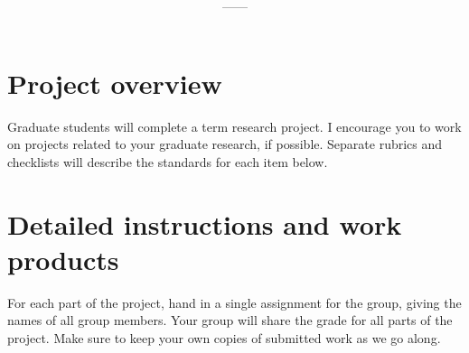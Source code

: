 \documentclass[11pt,onecolumn]{article}
\title{\textbf{\coursename}}
\author{{\semester}---{\roomnumb}---{\classtimes}}
\date{}
\makeatletter
\newcommand{\myname}{A.~Grant Schissler}
\newcommand{\myemail}{aschissler@unr.edu}
\newcommand{\office}{DMSC 224}
\newcommand{\officehours}{Tue 4pm-5pm, Wed 4pm-5pm, or by appointment}
\makeatother
\begin{document}
\maketitle

\vspace{-0.25in}
\noindent\makebox[\linewidth]{\rule{\textwidth}{1pt}}


\section*{Project overview}
Graduate students will complete a term research project. I encourage you to work on projects related to your graduate research, if possible. Separate rubrics and checklists will describe the standards for each item below.

\section*{Detailed instructions and work products}

For each part of the project, hand in a single assignment for the group, giving the names of all group members. Your group will share the grade for all parts of the project. Make sure to keep your own copies of submitted work as we go along. 
\end{document}
